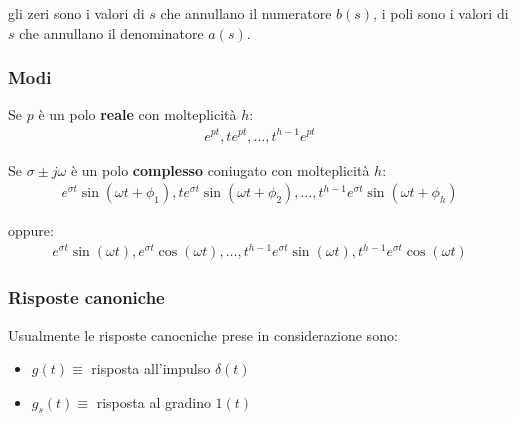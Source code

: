 gli zeri sono i valori di $s$ che annullano il numeratore $b(s)$, i poli sono i valori di $s$ che annullano il denominatore $a(s)$.

\subsubsection{Modi} %
\label{sec:Modi}
Se $p$ è un polo \textbf{reale} con molteplicità $h$:
\begin{align}
  e^{pt}, te^{pt}, \dots, t^{h-1}e^{pt}
\end{align}

Se $\sigma \pm j \omega$ è un polo \textbf{complesso} coniugato con molteplicità $h$:
\begin{align}
  e^{\sigma t} \sin(\omega t + \phi_1), te^{\sigma t} \sin(\omega t + \phi_2), \dots, t^{h-1}e^{\sigma t} \sin(\omega t + \phi_h)
\end{align}

oppure:
\begin{align}
  e^{\sigma t} \sin(\omega t), e^{\sigma t} \cos(\omega t), \dots, t^{h-1}e^{\sigma t} \sin(\omega t), t^{h-1}e^{\sigma t} \cos(\omega t)
\end{align}


\subsubsection{Risposte canoniche} %
\label{sec:Risposte canoniche}
Usualmente le risposte canocniche prese in considerazione sono:
\begin{itemize}
  \item $g(t) \equiv$ risposta all'impulso $\delta(t)$
  \item $g_s(t) \equiv$ risposta al gradino $1(t)$
\end{itemize}
